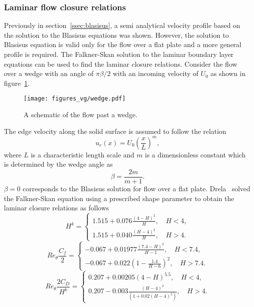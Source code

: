 \subsubsection{Laminar flow closure relations}
Previously in section~\ref{ssec:blasisus}, a semi analytical velocity profile based on the solution to the Blasisus equations was shown. However, the solution to Blasisus equation is valid only for the flow over a flat plate and a more general profile is required. The Falkner-Skan solution to the laminar boundary layer equations can be used to find the laminar closure relations. Consider the flow over a wedge with an angle of $\pi \beta/2$ with an incoming velocity of $U_0$ as shown in figure~\ref{fig:wedge}.
\begin{figure}[h]
\centering
\captionsetup{justification=centering}
 \texttt{[image: figures\_vg/wedge.pdf]}
 \caption{A schematic of the flow past a wedge.}
 \label{fig:wedge}
\end{figure}
The edge velocity along the solid surface is assumed to follow the relation
\begin{equation}
u_e(x) = U_0 \left(\frac{x}{L}\right)^m,
\end{equation}
where $L$ is a characteristic length scale and $m$ is a dimensionless constant which is determined by the wedge angle as
\begin{equation}
\beta = \frac{2m}{m+1}.
\end{equation}
$\beta = 0$ corresponds to the Blasisus solution for flow over a flat plate. Drela~\cite{drelaphdthesis} solved the Falkner-Skan equation using a prescribed shape parameter to obtain the laminar closure relations as follows
\begin{equation}
H^k = \begin{cases}
1.515 + 0.076\frac{(4-H)^2}{H},\quad H < 4,\\
1.515 + 0.040\frac{(H-4)^2}{H},\quad H > 4.
\end{cases}
\end{equation}
\begin{equation}
Re_{\theta}\frac{C_f}{2} = \begin{cases}
-0.067+ 0.01977\frac{(7.4-H)^2}{H-1},\quad H < 7.4,\\
-0.067+0.022\left(1-\frac{1.4}{H-6}\right)^2,\quad H > 7.4.
\end{cases}
\end{equation}
\begin{equation}
Re_{\theta}\frac{2C_D}{H^k} = \begin{cases}
0.207 + 0.00205(4-H)^{5.5},\quad H < 4,\\
0.207 - 0.003\frac{(H-4)^2}{(1+0.02(H-4)^2)},\quad H > 4.
\end{cases}
\end{equation}
